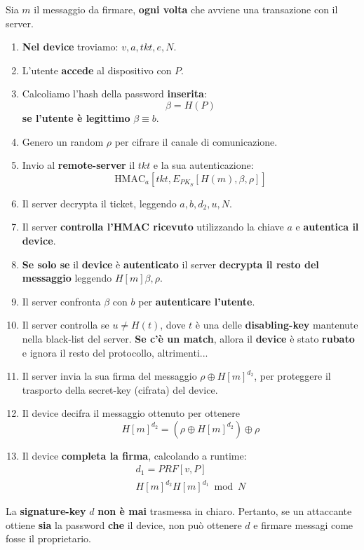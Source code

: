 \begin{corollary}\label{def:retrboost}
Sia $m$ il messaggio da firmare, \textbf{ogni volta} che avviene una transazione con il server.
\begin{enumerate}
    \item \textbf{Nel device} troviamo: $v,a,tkt,e,N$.
    \item L'utente \textbf{accede} al dispositivo con $P$.
    \item Calcoliamo l'hash della password \textbf{inserita}:\[\beta=H(P)\]
    \textbf{se l'utente è legittimo} $\beta\equiv b$.
    \item Genero un random $\rho$ per cifrare il canale di comunicazione.
    \item Invio al \textbf{remote-server} il $tkt$ e la sua autenticazione:
    \[\text{HMAC}_a[tkt, E_{PK_S}[H(m),\beta,\rho]]\]
    \item Il server decrypta il ticket, leggendo $a,b,d_2,u,N$.
    \item Il server \textbf{controlla l'HMAC ricevuto} utilizzando la chiave $a$ e \textbf{autentica il device}.
    \item \textbf{Se solo se} il \textbf{device} è \textbf{autenticato} il server \textbf{decrypta il resto del messaggio} leggendo $H[m]\beta,\rho$.
    \item Il server confronta $\beta$ con $b$ per \textbf{autenticare l'utente}.
    \item Il server controlla se $u\ne{H(t)}$, dove $t$ è una delle \textbf{disabling-key} mantenute nella black-list del server. \textbf{Se c'è un match}, allora il \textbf{device} è stato \textbf{rubato} e ignora il resto del protocollo, altrimenti...
    \item Il server invia la sua firma del messaggio $\rho\oplus H[m]^{d_2}$, per proteggere il trasporto della secret-key (cifrata) del device.
    \item Il device decifra il messaggio ottenuto per ottenere \[H[m]^{d_2}=(\rho\oplus H[m]^{d_2})\oplus \rho\]
    \item Il device \textbf{completa la firma}, calcolando a runtime:
    \begin{align*}
        d_1=PRF[v,P]\\
        H[m]^{d_2}H[m]^{d_1}\bmod{N}
    \end{align*}
    \end{enumerate}
\end{corollary}
\begin{note}
La \textbf{signature-key} $d$ \textbf{non è mai} trasmessa in chiaro. Pertanto, se un attaccante ottiene \textbf{sia} la password \textbf{che} il device, non può ottenere $d$ e firmare messagi come fosse il proprietario.
\end{note}
